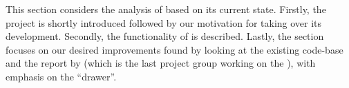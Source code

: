 This section considers the analysis of \launcher based on its current state.
Firstly, the \launcher project is shortly introduced followed by our motivation for taking over its development.
Secondly, the functionality of \launcher is described.
Lastly, the section focuses on our desired improvements found by looking at the existing code-base and the report by \citet{launcher2012} (which is the last project group working on the \launcher), with emphasis on the ``drawer''.
